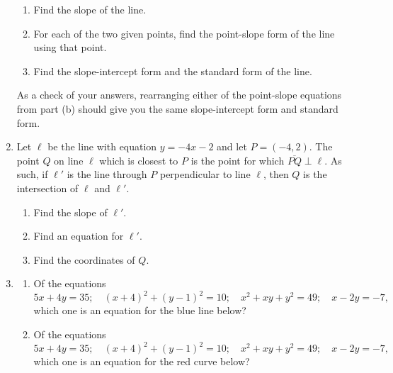 \begin{enumerate}
\begin{enumerate}
\item Find the slope of the line.
\item For each of the two given points, find the point-slope form of the line using that point.
\item Find the slope-intercept form and the standard form of the line.
\end{enumerate}
As a check of your answers, rearranging either of the point-slope equations from part (b) should give you the same slope-intercept form and standard form.
\item Let $\ell$ be the line with equation $y = -4x - 2$ and let $P = (-4, 2)$. The point $Q$ on line $\ell$ which is closest to $P$ is the point for which $\overline{PQ}\perp\ell$. As such, if $\ell'$ is the line through $P$ perpendicular to line $\ell$, then $Q$ is the intersection of $\ell$ and $\ell'$.
\begin{enumerate}
\item Find the slope of $\ell'$.
\item Find an equation for $\ell'$.
\item Find the coordinates of $Q$.
\end{enumerate}
\item \begin{enumerate}
\item Of the equations
\begin{equation*}
5x + 4y = 35;\quad (x + 4)^2 + (y - 1)^2 = 10;\quad x^2 + xy + y^2 = 49;\quad x - 2y = -7,
\end{equation*}
which one is an equation for the blue line below?
\item Of the equations
\begin{equation*}
5x + 4y = 35;\quad (x + 4)^2 + (y - 1)^2 = 10;\quad x^2 + xy + y^2 = 49;\quad x - 2y = -7,
\end{equation*}
which one is an equation for the red curve below?
\end{enumerate}
\begin{center}

\end{center}
\end{enumerate}
